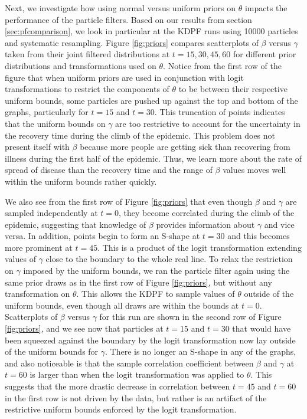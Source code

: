 \documentclass{elsarticle}
\begin{document}
Next, we investigate how using normal versus uniform priors on $\theta$ impacts the performance of the particle filters.  Based on our results from section \ref{sec:pfcomparison}, we look in particular at the KDPF runs using 10000 particles and systematic resampling.  Figure \ref{fig:priors} compares scatterplots of $\beta$ versus $\gamma$ taken from their joint filtered distributions at $t = 15, 30, 45, 60$ for different prior distributions and transformations used on $\theta$.  Notice from the first row of the figure that when uniform priors are used in conjunction with logit transformations to restrict the components of $\theta$ to be between their respective uniform bounds, some particles are pushed up against the top and bottom of the graphs, particularly for $t = 15$ and $t = 30$.   This truncation of points indicates that the uniform bounds on $\gamma$ are too restrictive to account for the uncertainty in the recovery time during the climb of the epidemic.  This problem does not present itself with $\beta$ because more people are getting sick than recovering from illness during the first half of the epidemic.  Thus, we learn more about the rate of spread of disease than the recovery time and the range of $\beta$ values moves well within the uniform bounds rather quickly.

We also see from the first row of Figure \ref{fig:priors} that even though $\beta$ and $\gamma$ are sampled independently at $t = 0$, they become correlated during the climb of the epidemic, suggesting that knowledge of $\beta$ provides information about $\gamma$ and vice versa. In addition, points begin to form an S-shape at $t = 30$ and this becomes more prominent at $t = 45$.  This is a product of the logit transformation extending values of $\gamma$ close to the boundary to the whole real line.  To relax the restriction on $\gamma$ imposed by the uniform bounds, we ran the particle filter again using the same prior draws as in the first row of Figure \ref{fig:priors}, but without any transformation on $\theta$.  This allows the KDPF to sample values of $\theta$ outside of the uniform bounds, even though all draws are within the bounds at $t = 0$.  Scatterplots of $\beta$ versus $\gamma$ for this run are shown in the second row of Figure \ref{fig:priors}, and we see now that particles at $t = 15$ and $t = 30$ that would have been squeezed against the boundary by the logit transformation now lay outside of the uniform bounds for $\gamma$.  There is no longer an S-shape in any of the graphs, and also noticeable is that the sample correlation coefficient between $\beta$ and $\gamma$ at $t = 60$ is larger than when the logit transformation was applied to $\theta$.  This suggests that the more drastic decrease in correlation between $t = 45$ and $t = 60$ in the first row is not driven by the data, but rather is an artifact of the restrictive uniform bounds enforced by the logit transformation.
\end{document}
